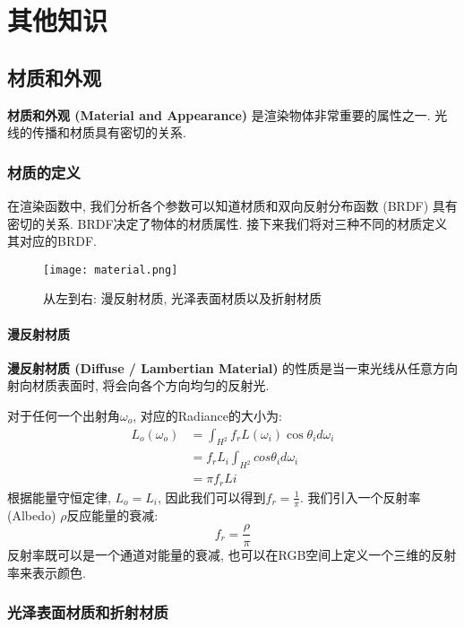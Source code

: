 \part{其他知识}

\chapter{材质和外观}

\textbf{材质和外观 (Material and Appearance) }是渲染物体非常重要的属性之一. 光线的传播和材质具有密切的关系. 

\section{材质的定义}

在渲染函数中, 我们分析各个参数可以知道材质和双向反射分布函数 (BRDF) 具有密切的关系. BRDF决定了物体的材质属性. 接下来我们将对三种不同的材质定义其对应的BRDF. 

\begin{figure}[H]
	\centering
	\texttt{[image: material.png]}
	\caption{从左到右: 漫反射材质, 光泽表面材质以及折射材质}
	\label{fig:material}
\end{figure}

\subsection{漫反射材质}
\textbf{漫反射材质 (Diffuse / Lambertian Material) }的性质是当一束光线从任意方向射向材质表面时, 将会向各个方向均匀的反射光. 

对于任何一个出射角$\omega_o$, 对应的Radiance的大小为: 
\begin{equation}
	\begin{split}
		L_o(\omega_o)&=\int_{H^2}f_rL(\omega_i)\cos\theta_id\omega_i\\
		&=f_rL_i\int_{H^2}cos\theta_id\omega_i\\
		&=\pi f_r Li
	\end{split}
\end{equation}
根据能量守恒定律, $L_o=L_i$, 因此我们可以得到$f_r=\frac{1}{\pi}$. 我们引入一个反射率 (Albedo) $\rho$反应能量的衰减: 
\begin{equation}
	f_r=\frac{\rho}{\pi}
\end{equation}
反射率既可以是一个通道对能量的衰减, 也可以在RGB空间上定义一个三维的反射率来表示颜色. 

\section{光泽表面材质和折射材质}

